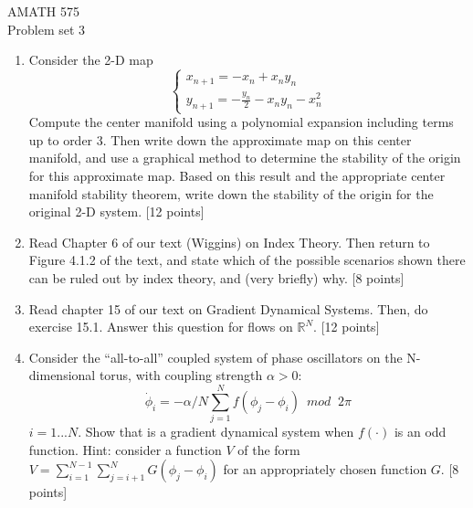 \documentclass{article}
\begin{document}
\begin{center}
AMATH 575 \\
Problem set 3\\[.3in]
\end{center}



\begin{enumerate}


 \item  Consider the 2-D map
 \begin{equation}
\left\{\begin{array}{l}
x_{n+1} = -x_n + x_n y_n \\
y_{n+1} = - \frac{y_n}{2} - x_n y_n - x_n^2  
\end{array}\right.
\end{equation}
Compute the center manifold using a polynomial expansion including terms up to order 3.  Then write down the approximate map on this center manifold, and use a graphical method to determine the stability of the origin for this approximate map.  Based on this result and the appropriate center manifold stability theorem, write down the stability of the origin for the original 2-D system. [12 points]


 \item  Read Chapter 6 of our text (Wiggins) on Index Theory.  Then return to Figure 4.1.2 of the text, and state which of the possible scenarios shown there can be ruled out by index theory, and (very briefly) why. [8 points]
 
 
 \item Read chapter 15 of our text on Gradient Dynamical Systems.  Then, do exercise 15.1.  Answer this question for flows on $\mathbb{R}^N$. [12 points] 

 \item  Consider the ``all-to-all'' coupled system of phase oscillators on the N-dimensional torus, with coupling strength $\alpha>0$:
 \begin{equation}
\dot \phi_i = - \alpha/N \sum_{j=1}^N f(\phi_j - \phi_i) \, \, \,  mod \; \; 2 \pi  
\end{equation}
$i=1...N$.  Show that is a gradient dynamical system when $f(\cdot)$ is an odd function.  Hint:  consider a function $V$ of the form $V = \sum_{i=1}^{N-1} \sum_{j=i+1}^{N} G(\phi_j - \phi_i)$ for an appropriately chosen function $G$.  
[8 points]



\end{enumerate}
\end{document}
